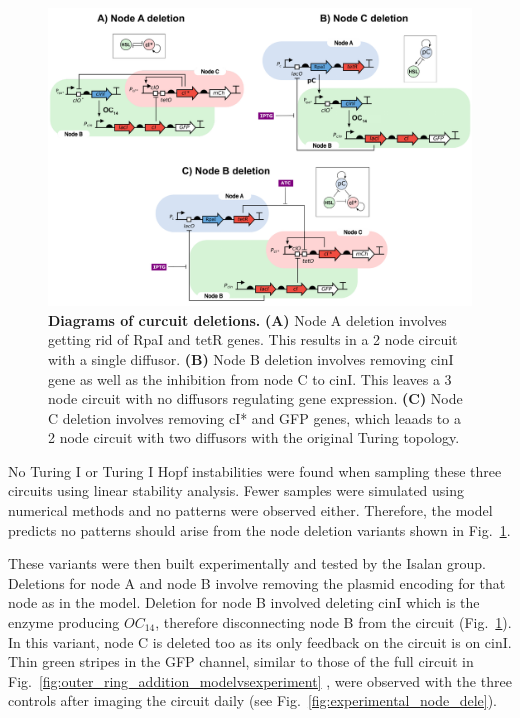 \begin{figure}[H] %
    \centering
    \begin{adjustbox}{center}
        \includegraphics[width=1.1\textwidth]{chapters/Chapter 3/deletion_circuits} %
    \end{adjustbox}
    \caption{\textbf{Diagrams of curcuit deletions.} \textbf{(A)} Node A deletion involves getting rid of RpaI and tetR genes. This results in a 2 node circuit with a single diffusor. \textbf{(B)} Node B deletion involves removing cinI gene as well as the inhibition from node C to cinI. This leaves a 3 node circuit with no diffusors regulating gene expression. \textbf{(C)} Node C deletion involves removing cI* and GFP genes, which leaads to a 2 node circuit with two diffusors with the original Turing topology.}
    \label{fig:deletion_circuits} %
\end{figure}

No Turing I or Turing I Hopf instabilities were found when sampling these three circuits using linear stability analysis. %
Fewer samples were simulated using numerical methods and no patterns were observed either. %
Therefore, the model predicts no patterns should arise from the node deletion variants shown in Fig.~\ref{fig:deletion_circuits}.

These variants were then built experimentally and tested by the
Isalan group.
Deletions for node A and node B involve removing the plasmid encoding for that node as in the model.
Deletion for node B involved deleting cinI which is the enzyme producing $OC_{14}$, therefore disconnecting node B from the circuit (Fig.~\ref{fig:deletion_circuits}).
In this variant, node C is deleted too as its only feedback on the circuit is on cinI.
Thin green stripes in the GFP channel, similar to those of the full circuit in Fig.~\ref{fig:outer_ring_addition_modelvsexperiment} , were observed with the three controls after imaging the circuit daily (see Fig.~\ref{fig:experimental_node_dele}).


